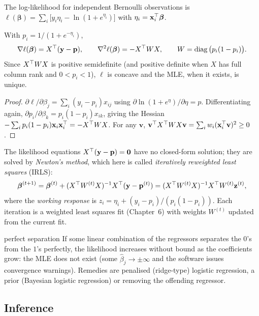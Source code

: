 The log-likelihood for independent Bernoulli observations is $\ell(\boldsymbol\beta)=\sum_i\big[y_i\eta_i-\ln(1+e^{\eta_i})\big]$ with $\eta_i=\mathbf{x}_i^{\top}\boldsymbol\beta$.

\begin{theorem}\label{thm:logit-score}
With $p_i=1/(1+e^{-\eta_i})$,
\[ \nabla\ell(\boldsymbol\beta)=X^{\top}(\mathbf{y}-\mathbf{p}),\qquad\nabla^2\ell(\boldsymbol\beta)=-X^{\top} WX,\qquad W=\operatorname{diag}\big(p_i(1-p_i)\big). \]
Since $X^{\top} WX$ is positive semidefinite (and positive definite when $X$ has full column rank and $0<p_i<1$), $\ell$ is concave and the MLE, when it exists, is unique.
\end{theorem}

\begin{proof}
$\partial\ell/\partial\beta_j=\sum_i(y_i-p_i)x_{ij}$ using $\partial\ln(1+e^{\eta})/\partial\eta=p$. Differentiating again, $\partial p_i/\partial\beta_k=p_i(1-p_i)x_{ik}$, giving the Hessian $-\sum_ip_i(1-p_i)\mathbf{x}_i\mathbf{x}_i^{\top}=-X^{\top} WX$. For any $\mathbf{v}$, $\mathbf{v}^{\top} X^{\top} WX\mathbf{v}=\sum_iw_i(\mathbf{x}_i^{\top}\mathbf{v})^2\ge0$.
\end{proof}

The likelihood equations $X^{\top}(\mathbf{y}-\mathbf{p})=\mathbf{0}$ have no closed-form solution; they are solved by \emph{Newton's method}, which here is called \emph{iteratively reweighted least squares} (IRLS):
\[ \boldsymbol\beta^{(t+1)}=\boldsymbol\beta^{(t)}+(X^{\top} W^{(t)}X)^{-1}X^{\top}(\mathbf{y}-\mathbf{p}^{(t)})=(X^{\top} W^{(t)}X)^{-1}X^{\top} W^{(t)}\mathbf{z}^{(t)}, \]
where the \emph{working response} is $z_i=\eta_i+(y_i-p_i)/(p_i(1-p_i))$. Each iteration is a weighted least squares fit (Chapter~6) with weights $W^{(t)}$ updated from the current fit.

\begin{pitfall}{perfect separation}
If some linear combination of the regressors separates the $0$'s from the $1$'s perfectly, the likelihood increases without bound as the coefficients grow: the MLE does not exist (some $\hat\beta_j\to\pm\infty$ and the software issues convergence warnings). Remedies are penalised (ridge-type) logistic regression, a prior (Bayesian logistic regression) or removing the offending regressor.
\end{pitfall}

\subsection{Inference}

